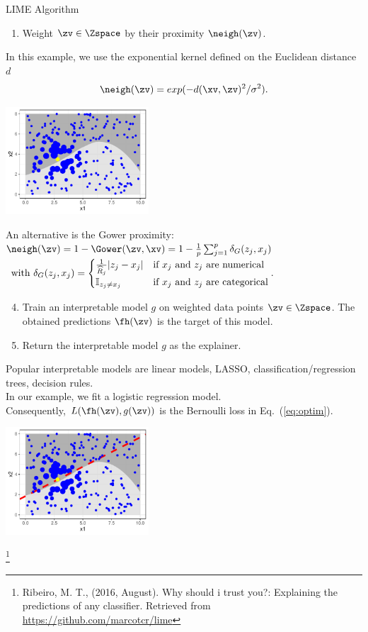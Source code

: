 \documentclass[11pt,compress,t,notes=noshow, aspectratio=169, xcolor=table]{beamer}
\begin{document}
\begin{vbframe}{LIME Algorithm}
\begin{enumerate}
		\framebreak
		\item Weight $\zv \in \Zspace$ by their proximity $\neigh(\zv)$.
		\\[0.2cm]
		\end{enumerate}
		In this example, we use the exponential kernel defined on the Euclidean distance $d$
		 $$\neigh(\zv) = exp(-d(\xv, \zv)^2/\sigma^2).$$ 
		\begin{center}
			\includegraphics[width=0.4\textwidth]{figure/lime4}
		\end{center}
	An alternative is the Gower proximity: 
	$\neigh(\zv) = 1 - \Gower(\zv, \xv) =  1 - \frac{1}{p}\sum_{j = 1}^{p} \delta_G(z_j, x_j) $ 
	$\textnormal{ with } \delta_G(z_j, x_j) = 
	\begin{cases}
	\frac{1}{\widehat{R}_j}|z_j- x_j| & \text{if $x_j$ and $z_j$ are numerical} \\
	\mathbb{I}_{z_j \neq x_j} & \text{if $x_j$ and $z_j$ are categorical}
	\end{cases}.$
		
		\framebreak
		\begin{enumerate}
			\setcounter{enumi}{3}
		\item Train an interpretable model $g$ on weighted data points $\zv \in \Zspace$. The obtained predictions $\fh(\zv)$ is the target of this model.
		\item Return the interpretable model $g$ as the explainer. \\[0.3cm]
			\end{enumerate}
		Popular interpretable models are linear models, LASSO, classification/regression trees, decision rules. \\
		In our example, we fit a logistic regression model. \\Consequently, $L(\fh(\zv), g(\zv))$  is the Bernoulli loss in Eq.~(\ref{eq:optim}). 
		\begin{center}
			\includegraphics[width=0.4\textwidth]{figure/lime5}
		\end{center}
		\footnote[frame]{Ribeiro, M. T., (2016, August). Why should i trust you?: Explaining the predictions of any classifier. Retrieved from \url{https://github.com/marcotcr/lime}}
\end{vbframe}
\end{document}
